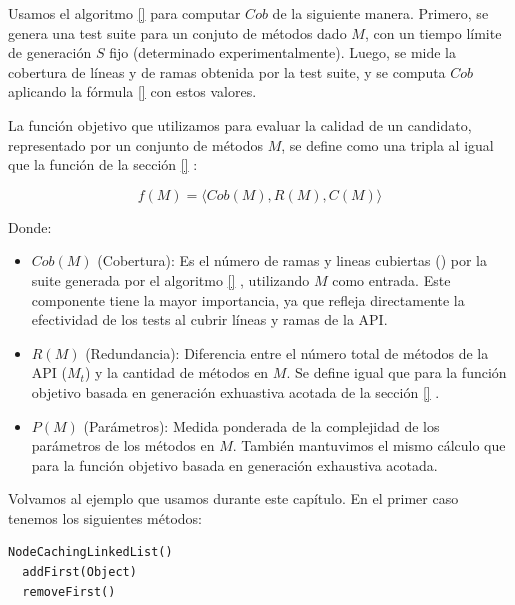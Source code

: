 
Usamos el algoritmo \ref{} para computar $Cob$ de la siguiente manera.
Primero, se genera una test suite para un conjuto de métodos dado $M$, con un tiempo límite
de generación $S$ fijo (determinado experimentalmente). Luego, se mide  
 la cobertura de líneas y de ramas obtenida por la test suite, y se computa
 $Cob$ aplicando la fórmula \ref{}  con estos valores.

La función objetivo que utilizamos para evaluar la calidad de un candidato, 
representado por un conjunto de métodos $M$, se define como una tripla al igual 
que la función de la sección \ref{} :

\[
f(M) = \langle Cob(M), R(M), C(M) \rangle
\]

Donde:

\begin{itemize}
    \item $Cob(M)$ (Cobertura): Es el número de ramas y lineas cubiertas
        () por la
        suite generada por el algoritmo \ref{} , utilizando $M$ como
        entrada. 
    Este componente tiene la mayor importancia, ya que refleja directamente la
    efectividad de los tests al cubrir líneas y ramas de la API.
\item $R(M)$ (Redundancia): Diferencia entre el número total de métodos de la
    API ($M_t$) y la cantidad de métodos en $M$. Se define igual que para la
    función objetivo basada en generación exhuastiva acotada de la sección \ref{} .
    \item $P(M)$ (Parámetros): Medida ponderada de la complejidad de los
        parámetros de los métodos en $M$. También mantuvimos el mismo cálculo
        que para la función objetivo basada en generación exhaustiva acotada.
\end{itemize}

Volvamos al ejemplo que usamos durante este capítulo. En el primer caso tenemos los siguientes métodos:
\vspace{5pt} 

\begin{lstlisting}[numbers=none, caption=Conjunto de métodos \( M_1 \)]
  NodeCachingLinkedList()
  addFirst(Object)
  removeFirst()
\end{lstlisting} 

